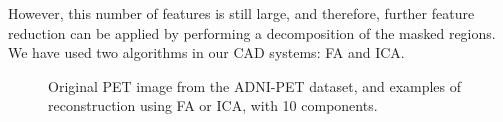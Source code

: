 However, this number of features is still large, and therefore, further feature reduction can be applied by performing a decomposition of the masked regions. We have used two algorithms in our \ac{CAD} systems: \acf{FA} and \acf{ICA}.

\begin{figure}[bth]
	\myfloatalign
	\quad
	\quad
	\caption[Original PET image and its reconstruction using FA or ICA.]{Original PET image from the ADNI-PET dataset, and examples of reconstruction using \ac{FA} or \ac{ICA}, with 10 components.}\label{fig:comparisonReconstructions}
\end{figure}


